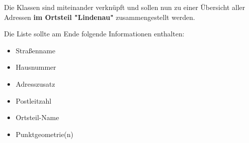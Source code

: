 \vspace{\baselineskip}\noindent
Die Klassen sind miteinander verknüpft und sollen nun zu einer Übersicht aller Adressen \textbf{im Ortsteil "Lindenau"} zusammengestellt werden.

\vspace{\baselineskip}\noindent
Die Liste sollte am Ende folgende Informationen enthalten:
\begin{itemize}
  \item Straßenname
  \item Hausnummer
  \item Adresszusatz
  \item Postleitzahl
  \item Ortsteil-Name
  \item Punktgeometrie(n)
\end{itemize}
